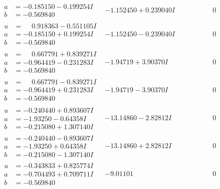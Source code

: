 \documentclass[1p]{elsarticle_modified}
\theoremstyle{definition}
\begin{document}
$$\begin{array}{c|c|c}
\begin{aligned}
a &= -0.185150 - 0.199254 I \\
b &= -0.569840\phantom{ +0.000000I}\end{aligned}
 & -1.152450 + 0.239040 I & \phantom{-0.000000 } 0 \\ \hline\begin{aligned}
u &= \phantom{-}0.918363 - 0.551105 I \\
a &= -0.185150 + 0.199254 I \\
b &= -0.569840\phantom{ +0.000000I}\end{aligned}
 & -1.152450 - 0.239040 I & \phantom{-0.000000 } 0 \\ \hline\begin{aligned}
u &= \phantom{-}0.667791 + 0.839271 I \\
a &= -0.964419 - 0.231283 I \\
b &= -0.569840\phantom{ +0.000000I}\end{aligned}
 & -1.94719 + 3.90370 I & \phantom{-0.000000 } 0 \\ \hline\begin{aligned}
u &= \phantom{-}0.667791 - 0.839271 I \\
a &= -0.964419 + 0.231283 I \\
b &= -0.569840\phantom{ +0.000000I}\end{aligned}
 & -1.94719 - 3.90370 I & \phantom{-0.000000 } 0 \\ \hline\begin{aligned}
u &= -0.240440 + 0.893607 I \\
a &= -1.93250 - 0.64358 I \\
b &= -0.215080 + 1.307140 I\end{aligned}
 & -13.14860 - 2.82812 I & \phantom{-0.000000 } 0 \\ \hline\begin{aligned}
u &= -0.240440 - 0.893607 I \\
a &= -1.93250 + 0.64358 I \\
b &= -0.215080 - 1.307140 I\end{aligned}
 & -13.14860 + 2.82812 I & \phantom{-0.000000 } 0 \\ \hline\begin{aligned}
u &= -0.343833 + 0.825774 I \\
a &= -0.704493 + 0.709711 I \\
b &= -0.569840\phantom{ +0.000000I}\end{aligned}
 & -9.01101\phantom{ +0.000000I} & \phantom{-0.000000 } 0 \\ \hline\begin{aligned}

\end{aligned}
\end{array}$$
\end{document}
